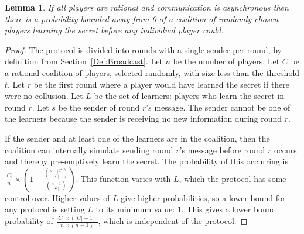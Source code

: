 \documentclass[12pt]{dalcsthesis}
\newtheorem{lemma}{Lemma}
\begin{document}
\begin{lemma}\label{Lem:Async:CoalitionsMayPreempt}If all players are rational and communication is asynchronous then there is a probability bounded away from 0 of a coalition of randomly chosen players learning the secret before any individual player could.\end{lemma}
\begin{proof}
The protocol is divided into rounds with a single sender per round, by definition from Section~\ref{Def:Broadcast}. 
Let $n$ be the number of players.
Let $C$ be a rational coalition of players, selected randomly, with size less than the threshold $t$.
Let $r$ be the first round where a player would have learned the secret if there were no collusion.
Let $L$ be the set of learners: players who learn the secret in round $r$.
Let $s$ be the sender of round $r$'s message.
The sender cannot be one of the learners because the sender is receiving no new information during round $r$.

If the sender and at least one of the learners are in the coalition, then the coalition can internally simulate sending round $r$'s message before round $r$ occurs and thereby pre-emptively learn the secret. The probability of this occurring is $\frac{|C|}{n} \times \left(1 - \frac{\binom{n - |C|}{|L|}}{\binom{n - 1}{|L|}}\right)$. This function varies with $L$, which the protocol has some control over. Higher values of $L$ give higher probabilities, so a lower bound for any protocol is setting $L$ to its minimum value: 1. This gives a lower bound probability of $\frac{|C| \times (|C| - 1)}{n \times (n-1)}$, which is independent of the protocol.
\end{proof}
\end{document}
